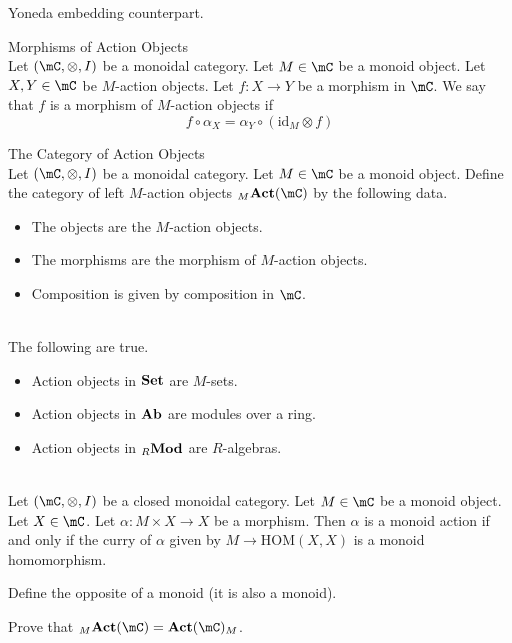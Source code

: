 \documentclass[a4paper]{article}
\begin{document}
Yoneda embedding counterpart. 

\begin{defn}{Morphisms of Action Objects}{}\\
Let $(\mC,\otimes,I)$ be a monoidal category. Let $M\in\mC$ be a monoid object. Let $X,Y\in\mC$ be $M$-action objects. Let $f:X\to Y$ be a morphism in $\mC$. We say that $f$ is a morphism of $M$-action objects if $$f\circ\alpha_X=\alpha_Y\circ(\text{id}_M\otimes f)$$
\end{defn}

\begin{defn}{The Category of Action Objects}{}\\
Let $(\mC,\otimes,I)$ be a monoidal category. Let $M\in\mC$ be a monoid object. Define the category of left $M$-action objects ${_M\bold{Act}}(\mC)$ by the following data. 
\begin{itemize}
\item The objects are the $M$-action objects. 
\item The morphisms are the morphism of $M$-action objects. 
\item Composition is given by composition in $\mC$. 
\end{itemize}
\end{defn}

\begin{eg}{}{}\\
The following are true. 
\begin{itemize}
\item Action objects in $\bold{Set}$ are $M$-sets. 
\item Action objects in $\bold{Ab}$ are modules over a ring. 
\item Action objects in ${_R}\bold{Mod}$ are $R$-algebras. 
\end{itemize}
\end{eg}

\begin{prp}{}{}\\
Let $(\mC,\otimes,I)$ be a closed monoidal category. Let $M\in\mC$ be a monoid object. Let $X\in\mC$. Let $\alpha:M\times X\to X$ be a morphism. Then $\alpha$ is a monoid action if and only if the curry of $\alpha$ given by $M\to\text{HOM}(X,X)$ is a monoid homomorphism. 
\end{prp}

Define the opposite of a monoid (it is also a monoid). 

Prove that ${_M}\bold{Act}(\mC)=\bold{Act}(\mC)_M$. 
\end{document}
